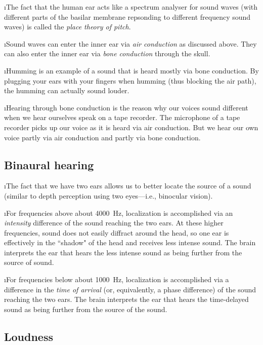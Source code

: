 \i The fact that the human ear acts like a spectrum analyser 
for sound waves (with different parts of the basilar membrane
repsonding to different frequency sound waves) 
is called the {\em place theory of pitch}.

\i Sound waves can enter the inner ear via {\em air conduction} 
as discussed above.
They can also enter the inner ear via {\em bone conduction} through 
the skull.

\i Humming is an example of a sound that is heard mostly 
via bone conduction.
By plugging your ears with your fingers when humming 
(thus blocking the air path), the humming can actually sound louder.

\i Hearing through bone conduction is the reason why our
voices sound different when we hear ourselves speak on a tape recorder.
The microphone of a tape recorder picks up our voice as it 
is heard via air conduction.
But we hear our own voice partly via air conduction and partly via
bone conduction.

\ei
\subsection{Binaural hearing}
\bi

\i The fact that we have two ears allows us to better 
locate the source of a sound (similar to depth perception
using two eyes---i.e., binocular vision).
 
\i For frequencies above about 4000~Hz, localization is
accomplished via an {\em intensity} difference of the 
sound reaching the two ears.
At these higher frequencies, sound does not easily 
diffract around the head, so one ear is effectively in
the ``shadow" of the head and receives less intense sound.
The brain interprets the ear that hears the less 
intense sound as being further from the source of sound.

\i For frequencies below about 1000~Hz, localization is
accomplished via a difference in the {\em time of arrival}
(or, equivalently, a phase difference) of the sound 
reaching the two ears.
The brain interprets the ear that hears the time-delayed 
sound as being further from the source of the sound.

\ei
\subsection{Loudness}
\bi

